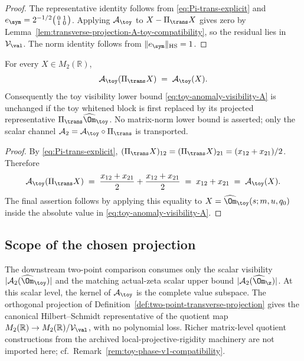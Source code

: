 \begin{proof}
The representative identity follows from
\eqref{eq:Pi-trans-explicit} and
\(e_\sym=2^{-1/2}\bigl(\begin{smallmatrix}0&1\\1&0\end{smallmatrix}\bigr)\).
Applying \(\mathcal A_\toy\) to \(X-\Pi_\trans X\) gives zero by
Lemma~\ref{lem:transverse-projection-A-toy-compatibility}, so the
residual lies in \(\mathcal V_\val\).  The norm identity follows from
\(\|e_\sym\|_{\mathrm{HS}}=1\).
\end{proof}

\begin{lemma}
\label{lem:transverse-projection-A-toy-compatibility}
For every \(X\in M_2(\mathbb R)\),
\begin{equation}
\label{eq:A-toy-pi-compat}
        \mathcal A_\toy(\Pi_\trans X)\;=\;\mathcal A_\toy(X).
\end{equation}
Consequently the toy visibility lower bound
\eqref{eq:toy-anomaly-visibility-A} is unchanged if the toy whitened
block is first replaced by its projected representative
\(\Pi_\trans\widehat\Om_\toy\).  No matrix-norm lower bound is
asserted; only the scalar channel
\(\mathcal A_2=\mathcal A_\toy\circ\Pi_\trans\) is transported.
\end{lemma}

\begin{proof}
By \eqref{eq:Pi-trans-explicit},
\((\Pi_\trans X)_{12}=(\Pi_\trans X)_{21}=(x_{12}+x_{21})/2\).
Therefore
\[
        \mathcal A_\toy(\Pi_\trans X)
        \;=\;\frac{x_{12}+x_{21}}{2}+\frac{x_{12}+x_{21}}{2}
        \;=\;x_{12}+x_{21}
        \;=\;\mathcal A_\toy(X).
\]
The final assertion follows by applying this equality to
\(X=\widehat\Om_\toy(s;m,u,q_0)\) inside the absolute value in
\eqref{eq:toy-anomaly-visibility-A}.
\end{proof}

\subsection{Scope of the chosen projection}
\label{subsec:transverse-projection-scope}

\begin{remark}
\label{rem:transverse-projection-no-richer-quotient}
The downstream two-point comparison consumes only the scalar
visibility \(|\mathcal A_2(\widehat\Om_\toy)|\) and the matching
actual-zeta scalar upper bound
\(|\mathcal A_2(\widehat\Om_\z)|\).  At this scalar level, the kernel
of \(\mathcal A_\toy\) is the complete value subspace.  The
orthogonal projection of
Definition~\ref{def:two-point-transverse-projection} gives the canonical
Hilbert--Schmidt representative of the quotient map
\(M_2(\mathbb R)\to M_2(\mathbb R)/\mathcal V_\val\), with no
polynomial loss.  Richer matrix-level quotient constructions from the
archived local-projective-rigidity machinery are not imported here;
cf.\ Remark~\ref{rem:toy-phase-v1-compatibility}.
\end{remark}

